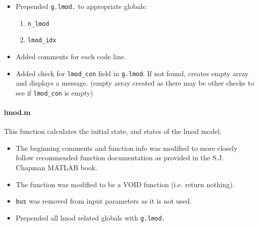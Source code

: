 \documentclass[12pt]{article}
\begin{document}
\begin{itemize}
\item Prepended \verb|g.lmod.| to appropriate globals:
\begin{enumerate}
\item \verb|n_lmod|
\item \verb|lmod_idx|
\end{enumerate}
\item Added comments for each code line.
\item Added check for \verb|lmod_con| field in \verb|g.lmod|. If not found, creates empty array and displays a message.
(empty array created as there may be other checks to see if \verb|lmod_con| is empty)
\end{itemize}

\paragraph{lmod.m}
This function calculates the initial state, and states of the lmod model.

\begin{itemize}
\item The beginning comments and function info was modified to more closely follow recommended function documentation as provided in the S.J. Chapman MATLAB book.

\item The function was modified to be a VOID function (i.e. return nothing).

\item \verb|bus| was removed from input parameters as it is not used.

\item Prepended all lmod related globals with \verb|g.lmod.|

\end{itemize}

\end{document}
